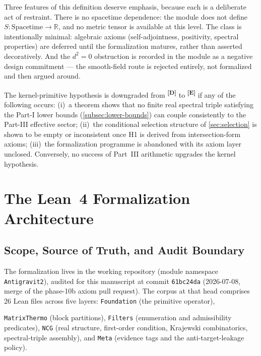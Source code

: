 \documentclass[12pt,a4paper,twoside]{article}
\theoremstyle{plain}
\theoremstyle{definition}
\theoremstyle{remark}
\newcommand{\catmark}[1]{\textsuperscript{\textsf{\textbf{[#1]}}}}
\begin{document}
Three features of this definition deserve emphasis, because each is a
deliberate act of restraint. There is no spacetime dependence: the module
does not define $S \colon \mathrm{Spacetime} \to \mathbb R$, and no metric
tensor is available at this level. The class is intentionally minimal:
algebraic axioms (self-adjointness, positivity, spectral properties) are
deferred until the formalization matures, rather than asserted
decoratively. And the $d^2=0$ obstruction is recorded in the module as a
negative design commitment --- the smooth-field route is rejected
entirely, not formalized and then argued around.

\begin{killswitch}
The kernel-primitive hypothesis is downgraded from \catmark{D} to
\catmark{E} if any of the following occurs: (i)~a theorem shows that no
finite real spectral triple satisfying the Part-I lower bounds
(\cref{subsec:lower-bounds}) can couple consistently to the Part-III
effective sector; (ii)~the conditional selection structure of
\cref{sec:selection} is shown to be empty or inconsistent once H1 is
derived from intersection-form axioms; (iii)~the formalization programme
is abandoned with its axiom layer unclosed. Conversely, no success of
Part~III arithmetic upgrades the kernel hypothesis.
\end{killswitch}

\newpage
\section{The Lean~4 Formalization Architecture}
\label{sec:lean-architecture}

\subsection{Scope, Source of Truth, and Audit Boundary}
\label{subsec:lean-scope}

{\sloppy The formalization lives in the working repository
 (module namespace
\texttt{Antigravit2}), audited for this manuscript at commit
\texttt{61bc24da} (2026-07-08, merge of the phase-10b axiom pull
request). The corpus at that head comprises 26 Lean files across five
layers: \texttt{Foundation} (the primitive operator),\par}
\texttt{MatrixThermo} (block partitions), \texttt{Filters} (enumeration
and admissibility predicates), \texttt{NCG} (real structure, first-order
condition, Krajewski combinatorics, spectral-triple assembly), and
\texttt{Meta} (evidence tags and the anti-target-leakage policy).
\end{document}
